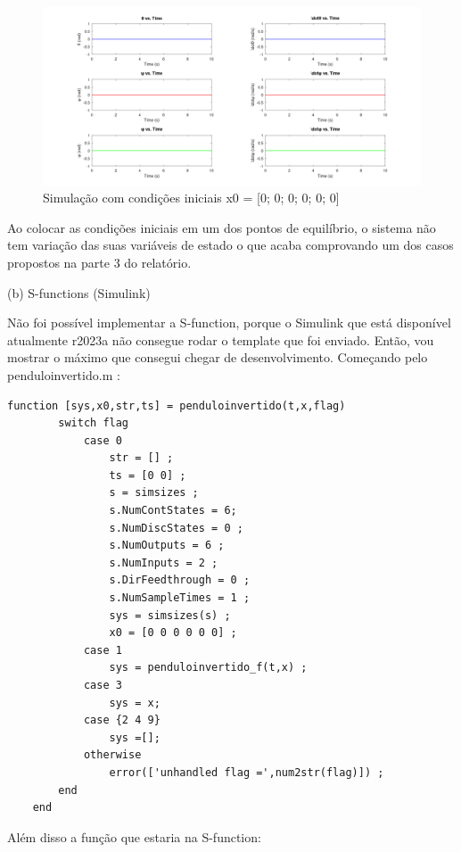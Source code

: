 \documentclass[10pt]{article}
\begin{document}
\begin{figure}[h]
    \centering
    \includegraphics[scale=0.229]{ode45_2.png}
    \caption{Simulação com condições iniciais x0 = [0; 0; 0; 0; 0; 0]}
\end{figure}

\quad Ao colocar as condições iniciais em um dos pontos de equilíbrio, o sistema não tem variação das suas variáveis de estado
o que acaba comprovando um dos casos propostos na parte 3 do relatório.

\newpage

\quad (b) S-functions (Simulink)

\quad Não foi possível implementar a S-function, porque o Simulink que está disponível atualmente r2023a não consegue rodar o template que foi enviado.
Então, vou mostrar o máximo que consegui chegar de desenvolvimento. Começando pelo penduloinvertido.m :

\begin{lstlisting}[caption={penduloinvertido.m}, label=lst:pendulum_dead]
    function [sys,x0,str,ts] = penduloinvertido(t,x,flag)
        switch flag
            case 0
                str = [] ;
                ts = [0 0] ;
                s = simsizes ;
                s.NumContStates = 6;
                s.NumDiscStates = 0 ;
                s.NumOutputs = 6 ;
                s.NumInputs = 2 ;
                s.DirFeedthrough = 0 ;
                s.NumSampleTimes = 1 ;
                sys = simsizes(s) ;
                x0 = [0 0 0 0 0 0] ;
            case 1
                sys = penduloinvertido_f(t,x) ;
            case 3
                sys = x;
            case {2 4 9}
                sys =[];
            otherwise
                error(['unhandled flag =',num2str(flag)]) ;
        end
    end
\end{lstlisting}

\quad Além disso a função que estaria na S-function:
\end{document}
